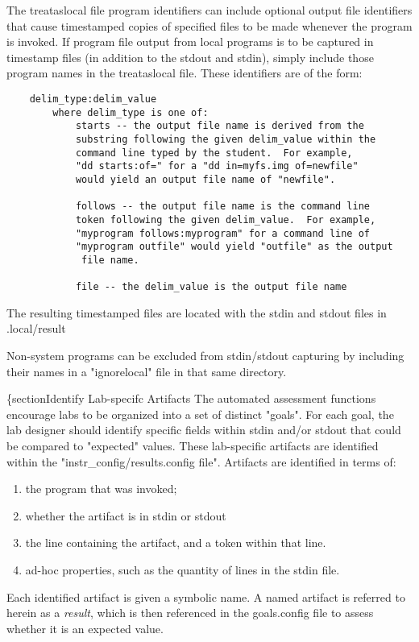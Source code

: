 \documentclass[12pt]{article}
\begin{document}
The treataslocal file program identifiers can include optional output file identifiers that
cause timestamped copies of specified files to be made whenever the program is invoked.  
If program file output from local programs is to be captured in timestamp files (in addition
to the stdout and stdin), simply include those program names in the treataslocal file.
These identifiers are of the form:
\begin{verbatim}
    delim_type:delim_value
        where delim_type is one of:
            starts -- the output file name is derived from the 
            substring following the given delim_value within the 
            command line typed by the student.  For example, 
            "dd starts:of=" for a "dd in=myfs.img of=newfile" 
            would yield an output file name of "newfile".
     
            follows -- the output file name is the command line 
            token following the given delim_value.  For example, 
            "myprogram follows:myprogram" for a command line of
            "myprogram outfile" would yield "outfile" as the output 
             file name.

            file -- the delim_value is the output file name
\end{verbatim}
\noindent The resulting timestamped files are located with the stdin and stdout files in .local/result

Non-system programs can be excluded from stdin/stdout capturing by including their names in
a "ignorelocal" file in that same directory.

\{section{Identify Lab-specifc Artifacts}
The automated assessment functions encourage labs to be organized into a set of distinct "goals".
For each goal, the lab designer should identify specific fields within stdin and/or stdout that
could be compared to "expected" values.  These lab-specific artifacts are identified within the
"instr\_config/results.config file".  Artifacts are identified in terms of:
\begin{enumerate}
\item the program that was invoked;
\item whether the artifact is in stdin or stdout
\item the line containing the artifact, and a token within that line.
\item ad-hoc properties, such as the quantity of lines in the stdin file.
\end{enumerate}

Each identified artifact is given a symbolic name. A named artifact is referred to herein as a \textit{result}, which 
is then referenced in the goals.config file to assess whether it is an expected value.
\end{document}
